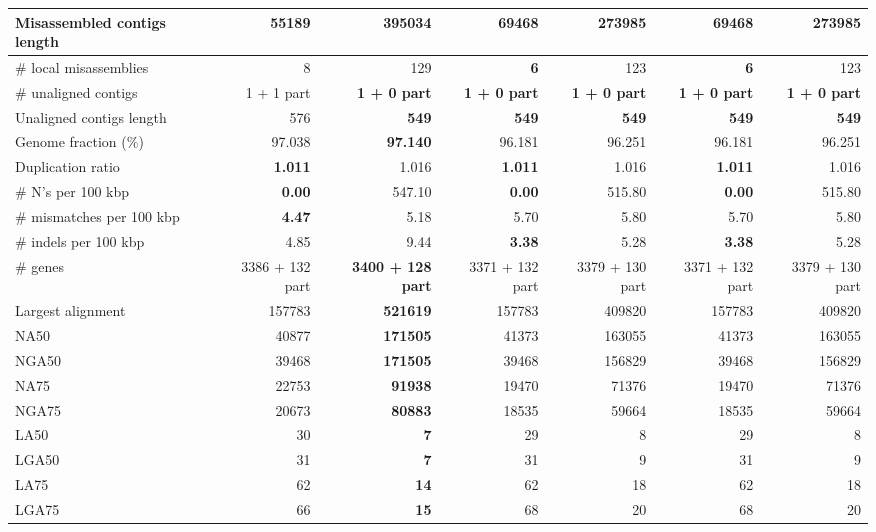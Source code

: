 \documentclass[12pt,a4paper]{article}
\begin{document}
\begin{table}[ht]
\begin{center}
\begin{tabular}{|l*{6}{|r}|}
Misassembled contigs length & {\bf 55189} & 395034 & 69468 & 273985 & 69468 & 273985 \\ \hline
\# local misassemblies & 8 & 129 & {\bf 6} & 123 & {\bf 6} & 123 \\ \hline
\# unaligned contigs & 1 + 1 part & {\bf 1 + 0 part} & {\bf 1 + 0 part} & {\bf 1 + 0 part} & {\bf 1 + 0 part} & {\bf 1 + 0 part} \\ \hline
Unaligned contigs length & 576 & {\bf 549} & {\bf 549} & {\bf 549} & {\bf 549} & {\bf 549} \\ \hline
Genome fraction (\%) & 97.038 & {\bf 97.140} & 96.181 & 96.251 & 96.181 & 96.251 \\ \hline
Duplication ratio & {\bf 1.011} & 1.016 & {\bf 1.011} & 1.016 & {\bf 1.011} & 1.016 \\ \hline
\# N's per 100 kbp & {\bf 0.00} & 547.10 & {\bf 0.00} & 515.80 & {\bf 0.00} & 515.80 \\ \hline
\# mismatches per 100 kbp & {\bf 4.47} & 5.18 & 5.70 & 5.80 & 5.70 & 5.80 \\ \hline
\# indels per 100 kbp & 4.85 & 9.44 & {\bf 3.38} & 5.28 & {\bf 3.38} & 5.28 \\ \hline
\# genes & 3386 + 132 part & {\bf 3400 + 128 part} & 3371 + 132 part & 3379 + 130 part & 3371 + 132 part & 3379 + 130 part \\ \hline
Largest alignment & 157783 & {\bf 521619} & 157783 & 409820 & 157783 & 409820 \\ \hline
NA50 & 40877 & {\bf 171505} & 41373 & 163055 & 41373 & 163055 \\ \hline
NGA50 & 39468 & {\bf 171505} & 39468 & 156829 & 39468 & 156829 \\ \hline
NA75 & 22753 & {\bf 91938} & 19470 & 71376 & 19470 & 71376 \\ \hline
NGA75 & 20673 & {\bf 80883} & 18535 & 59664 & 18535 & 59664 \\ \hline
LA50 & 30 & {\bf 7} & 29 & 8 & 29 & 8 \\ \hline
LGA50 & 31 & {\bf 7} & 31 & 9 & 31 & 9 \\ \hline
LA75 & 62 & {\bf 14} & 62 & 18 & 62 & 18 \\ \hline
LGA75 & 66 & {\bf 15} & 68 & 20 & 68 & 20 \\ \hline
\end{tabular}
\end{center}
\end{table}
\end{document}
